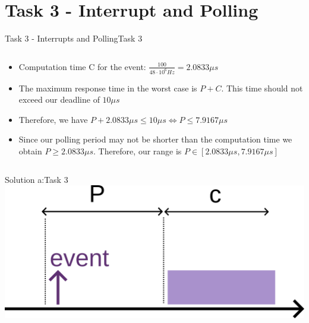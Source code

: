 
\section{Task 3 - Interrupt and Polling}

\setcounter{task}{1}

\begin{frame}[fragile]{Task 3 - Interrupts and Polling}{Task 3}
  \begin{solution}
    \begin{columns}
      \begin{column}{0.8\textwidth}
        \begin{itemize}
          \item Computation time C for the event: $\frac{100}{48 \cdot 10^6 Hz} = 2.0833\mu s$
          \item The maximum response time in the worst case is $P + C$. This time should not exceed our deadline of $10 \mu s$
          \item Therefore, we have $P + 2.0833\mu s \leq 10\mu s \Longleftrightarrow P \leq 7.9167\mu s$
          \item Since our polling period may not be shorter than the computation time we obtain $P \geq 2.0833\mu s$. Therefore, our range is $P \in [2.0833\mu s, 7.9167\mu s]$
        \end{itemize}
      \end{column}
    \end{columns}
  \end{solution}
\end{frame}

\begin{frame}{Solution a:}{Task 3}
  \centering
  \includegraphics[height=0.4\paperheight]{figures/task3-a.png}
\end{frame}

